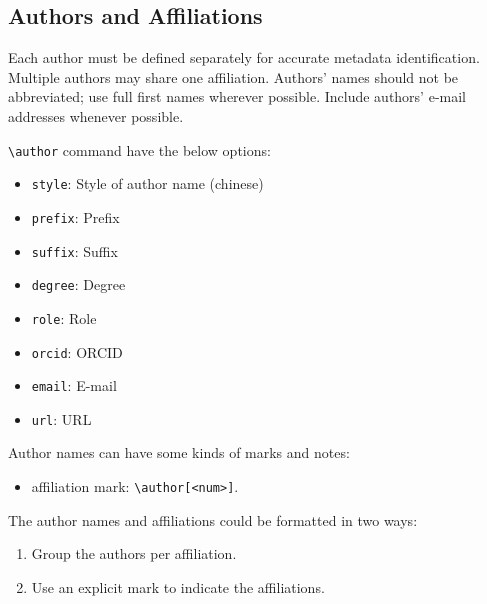 \documentclass[
]{ceurart}
\begin{document}


\subsection{Authors and Affiliations}

Each author must be defined separately for accurate metadata
identification. Multiple authors may share one affiliation. Authors'
names should not be abbreviated; use full first names wherever
possible. Include authors' e-mail addresses whenever possible.

\verb|\author| command have the below options:

\begin{itemize}
\item \verb|style|: Style of author name (chinese)
\item \verb|prefix|: Prefix
\item \verb|suffix|: Suffix
\item \verb|degree|: Degree
\item \verb|role|: Role
\item \verb|orcid|: ORCID
\item \verb|email|: E-mail
\item \verb|url|: URL
\end{itemize}

Author names can have some kinds of marks and notes:
\begin{itemize}
\item affiliation mark: \verb|\author[<num>]|.
\end{itemize}

The author names and affiliations could be formatted in two ways:
\begin{enumerate}
\item Group the authors per affiliation.
\item Use an explicit mark to indicate the affiliations.
\end{enumerate}
\end{document}
